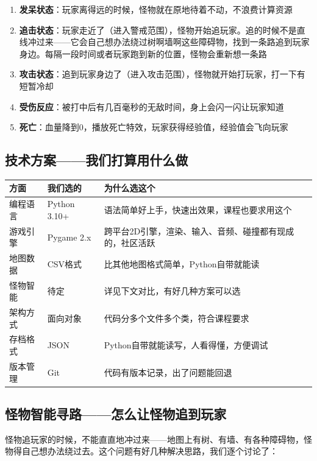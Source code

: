 \documentclass[12pt,a4paper]{article}
\begin{document}
\begin{enumerate}[leftmargin=2em]
    \item \textbf{发呆状态}：玩家离得远的时候，怪物就在原地待着不动，不浪费计算资源
    \item \textbf{追击状态}：玩家走近了（进入警戒范围），怪物开始追玩家。追的时候不是直线冲过来——它会自己想办法绕过树啊墙啊这些障碍物，找到一条路追到玩家身边。每隔一段时间或者玩家跑到新的位置，怪物会重新想一条路
    \item \textbf{攻击状态}：追到玩家身边了（进入攻击范围），怪物就开始打玩家，打一下有短暂冷却
    \item \textbf{受伤反应}：被打中后有几百毫秒的无敌时间，身上会闪一闪让玩家知道
    \item \textbf{死亡}：血量降到0，播放死亡特效，玩家获得经验值，经验值会飞向玩家
\end{enumerate}

\subsection{技术方案——我们打算用什么做}

\begin{table}[htbp]
\centering
\renewcommand{\arraystretch}{1.4}
\begin{tabularx}{\textwidth}{lXX}
\toprule
\textbf{方面} & \textbf{我们选的} & \textbf{为什么选这个} \\
\midrule
编程语言 & Python 3.10+ & 语法简单好上手，快速出效果，课程也要求用这个 \\
游戏引擎 & Pygame 2.x & 跨平台2D引擎，渲染、输入、音频、碰撞都有现成的，社区活跃 \\
地图数据 & CSV格式 & 比其他地图格式简单，Python自带就能读 \\
怪物智能 & 待定 & 详见下文对比，有好几种方案可以选 \\
架构方式 & 面向对象 & 代码分多个文件多个类，符合课程要求 \\
存档格式 & JSON & Python自带就能读写，人看得懂，方便调试 \\
版本管理 & Git & 代码有版本记录，出了问题能回退 \\
\bottomrule
\end{tabularx}
\end{table}

\subsection{怪物智能寻路——怎么让怪物追到玩家}

怪物追玩家的时候，不能直直地冲过来——地图上有树、有墙、有各种障碍物，怪物得自己想办法绕过去。这个问题有好几种解决思路，我们逐个讨论了：
\end{document}
